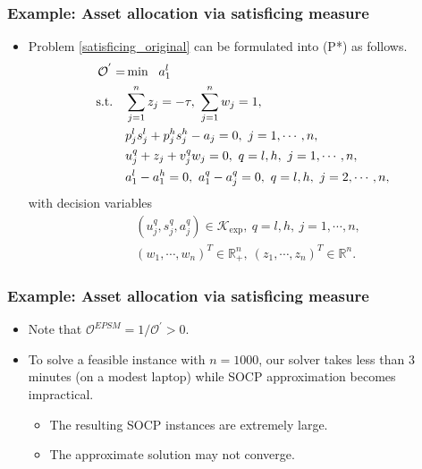 \documentclass{beamer}
\begin{document}
\begin{frame}
	\frametitle{Example: Asset allocation via satisficing measure}
	\begin{itemize}
		\item Problem \eqref{satisficing_original} can be formulated into (P*) as follows.
		\begin{align}\label{epsm_std_form_minimization}
		\begin{split}
		\mathcal{O}^{'} = &\min\ \ a_1^l \\
		\textnormal{s.t.}\quad &\sum_{j=1}^n z_j = -\tau,\ \sum_{j=1}^n w_j = 1, \\
		& p_j^l s_j^l +p_j^h s_j^h - a_j = 0,\ j=1,\cdots,n, \\
		& u_j^q + z_j + v_j^q w_j = 0,\ q=l,h,\ j = 1,\cdots, n, \\
		& a^l_1 - a^h_1 =0,\ a^q_1 - a^q_j = 0,\ q=l,h,\ j = 2, \cdots, n, \\
		\end{split}
		\end{align}
		with decision variables
		\begin{align*}
		&\left(u_j^q, s_j^q, a_j^q\right) \in \mathcal{K}_{\exp},\ q = l,h,\ j=1,\cdots,n, \\
		&\left(w_1,\cdots,w_n\right)^T\in \mathbb{R}_+^n,\ \left(z_1,\cdots,z_n\right)^T \in \mathbb{R}^n.
		\end{align*}
	\end{itemize}
\end{frame}

\begin{frame}
	\frametitle{Example: Asset allocation via satisficing measure}
	\begin{itemize}
		\item Note that $\mathcal{O}^{EPSM} = 1/\mathcal{O}^{'}>0$.
		\item To solve a feasible instance with $n= 1000$, our solver takes less than 3 minutes (on a modest laptop) while SOCP approximation becomes impractical.
		\begin{itemize}
			\item The resulting SOCP instances are extremely large.
			\item The approximate solution may not converge.
		\end{itemize}
	\end{itemize}
\end{frame}
\end{document}
